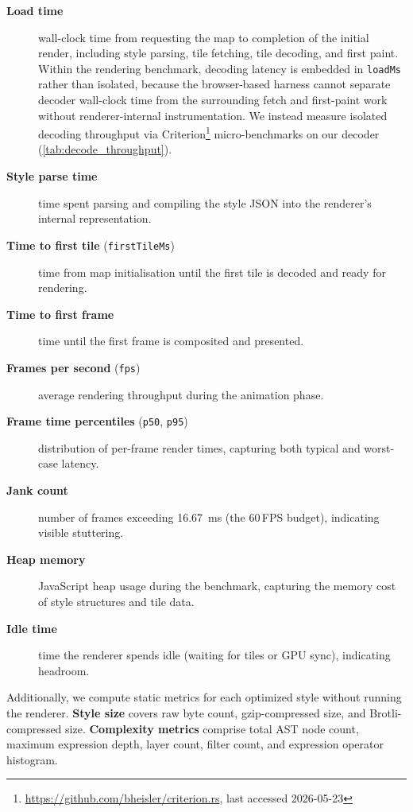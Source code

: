 {\begin{description}
    \item[\textbf{Load time}] wall-clock time from requesting the map to completion of the initial render, including style parsing, tile fetching, tile decoding, and first paint.
    Within the rendering benchmark, decoding latency is embedded in \texttt{loadMs} rather than isolated, because the browser-based harness cannot separate decoder wall-clock time from the surrounding fetch and first-paint work without renderer-internal instrumentation.
    We instead measure isolated decoding throughput via Criterion\footnote{\url{https://github.com/bheisler/criterion.rs}, last accessed 2026-05-23} micro-benchmarks on our decoder (\cref{tab:decode_throughput}).
    \item[\textbf{Style parse time}] time spent parsing and compiling the style \ac{JSON} into the renderer's internal representation.
    \item[\textbf{Time to first tile} (\texttt{firstTileMs})] time from map initialisation until the first tile is decoded and ready for rendering.
    \item[\textbf{Time to first frame}] time until the first frame is composited and presented.
    \item[\textbf{Frames per second} (\texttt{fps})] average rendering throughput during the animation phase.
    \item[\textbf{Frame time percentiles} (\texttt{p50}, \texttt{p95})] distribution of per-frame render times, capturing both typical and worst-case latency.
    \item[\textbf{Jank count}] number of frames exceeding \qty{16.67}{\milli\second} (the 60\,\ac{FPS} budget), indicating visible stuttering.
    \item[\textbf{Heap memory}] JavaScript heap usage during the benchmark, capturing the memory cost of style structures and tile data.
    \item[\textbf{Idle time}] time the renderer spends idle (waiting for tiles or \ac{GPU} sync), indicating headroom.
\end{description}

\noindent Additionally, we compute static metrics for each optimized style without running the renderer.
\textbf{Style size} covers raw byte count, gzip-compressed size, and Brotli-compressed size.
\textbf{Complexity metrics} comprise total \ac{AST} node count, maximum expression depth, layer count, filter count, and expression operator histogram.

}
